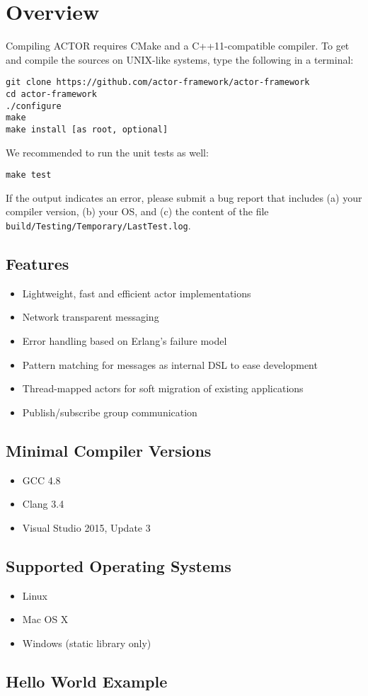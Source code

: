 \section{Overview}

Compiling ACTOR requires CMake and a C++11-compatible compiler. To get and
compile the sources on UNIX-like systems, type the following in a terminal:

\begin{verbatim}
git clone https://github.com/actor-framework/actor-framework
cd actor-framework
./configure
make
make install [as root, optional]
\end{verbatim}

We recommended to run the unit tests as well:

\begin{verbatim}
make test
\end{verbatim}

If the output indicates an error, please submit a bug report that includes (a)
your compiler version, (b) your OS, and (c) the content of the file
\texttt{build/Testing/Temporary/LastTest.log}.

\subsection{Features}

\begin{itemize}
  \item Lightweight, fast and efficient actor implementations
  \item Network transparent messaging
  \item Error handling based on Erlang's failure model
  \item Pattern matching for messages as internal DSL to ease development
  \item Thread-mapped actors for soft migration of existing applications
  \item Publish/subscribe group communication
\end{itemize}


\subsection{Minimal Compiler Versions}

\begin{itemize}
  \item GCC 4.8
  \item Clang 3.4
  \item Visual Studio 2015, Update 3
\end{itemize}

\subsection{Supported Operating Systems}

\begin{itemize}
\item Linux
\item Mac OS X
\item Windows (static library only)
\end{itemize}

\clearpage
\subsection{Hello World Example}

